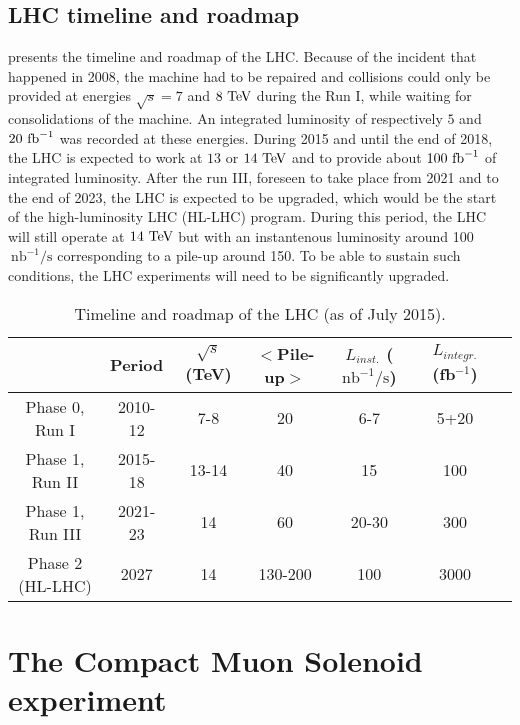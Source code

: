     \subsection{LHC timeline and roadmap}

     presents the timeline and roadmap of the LHC. Because of the
    incident that happened in 2008, the machine had to be repaired and collisions could
    only be provided at energies $\sqrt{s} = 7$ and $8~\text{TeV}$ during the Run I, while waiting for consolidations
    of the machine. An integrated luminosity of respectively $5$ and $20~\text{fb}^{-1}$ was recorded
    at these energies. During 2015 and until the end of 2018, the LHC is expected to work
    at $13$ or $14~\text{TeV}$ and to provide about $100~\text{fb}^{-1}$ of integrated luminosity. After
    the run III, foreseen to take place from 2021 and to the end of 2023, the LHC is expected to be upgraded,
    which would be the start of the high-luminosity LHC (HL-LHC) program. During this period,
    the LHC will still operate at $14~\text{TeV}$ but with an instantenous luminosity around
    100$~\text{nb}^{-1} / \text{s}$ corresponding to a pile-up around 150. To be able to
    sustain such conditions, the LHC experiments will need to be significantly upgraded.

    \begin{table}[h]
        \begin{tabular}{|c|c|c|c|c|c|c|}
            \hline
            & Period
            & $\sqrt{s}$ (TeV)
            & $<$Pile-up$>$
            & $L_{inst.}$ ($\text{nb}^{-1} / \text{s}$)
            & $L_{integr.}$ (fb$^{-1}$) \\
            \hline
            Phase 0, Run I    & 2010-12 & 7-8   & 20      & 6-7   & 5+20\\
            \hline
            \hline
            Phase 1, Run II   & 2015-18 & 13-14 & 40      & 15    & 100\\
            Phase 1, Run III  & 2021-23 & 14    & 60      & 20-30 & 300\\
            \hline
            \hline
            Phase 2 (HL-LHC)  & 2027    & 14    & 130-200 & 100   & 3000\\
            \hline
        \end{tabular}
        \caption{Timeline and roadmap of the LHC (as of July 2015).\label{tab:LHCtimeline}}
    \end{table}

    \section{The Compact Muon Solenoid experiment \label{sec:CMSexperiment}}

